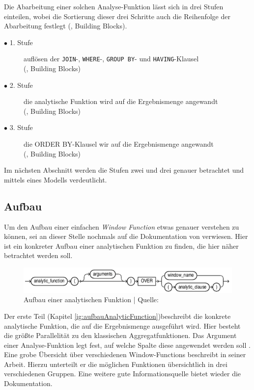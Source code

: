Die Abarbeitung einer solchen Analyse-Funktion lässt sich in drei Stufen einteilen,
wobei die Sortierung dieser drei Schritte auch die Reihenfolge der Abarbeitung
festlegt (\cite{Nuijten2023}, Building Blocks).
\begin{description}
	\item[$\bullet$ 1. Stufe] auflösen der \texttt{JOIN}-, \texttt{WHERE}-, \texttt{GROUP
		BY}- und \texttt{HAVING}-Klausel \\ (\cite{Nuijten2023}, Building Blocks)

	\item[$\bullet$ 2. Stufe] die analytische Funktion wird auf die Ergebnismenge angewandt
		\\ (\cite{Nuijten2023}, Building Blocks)

	\item[$\bullet$ 3. Stufe] die ORDER BY-Klausel wir auf die Ergebnismenge angewandt
		\\ (\cite{Nuijten2023}, Building Blocks)
\end{description}
Im nächsten Abschnitt werden die Stufen zwei und drei genauer betrachtet und
mittels eines Modells verdeutlicht.

\subsection{Aufbau}
\label{sec:aufbau} Um den Aufbau einer einfachen \textit{Window Function} etwas genauer
verstehen zu können, sei an dieser Stelle nochmals auf die Dokumentation von
\citet{oracle} verwiesen. Hier ist ein konkreter Aufbau einer analytischen
Funktion zu finden, die hier näher betrachtet werden soll.
\begin{figure}[h]
	\centering
	\includegraphics[scale=0.5]{img/aufbauAnalyticFunction.jpg}
	\caption{ Aufbau einer analytischen Funktion | Quelle: \citep{oracle}}
	\label{fig:aufbauAnalyticFunction}
\end{figure}
Der erste Teil (Kapitel \ref{ig:aufbauAnalyticFunction})beschreibt die konkrete analytische
Funktion, die auf die Ergebnismenge ausgeführt wird. Hier besteht die größte Parallelität
zu den klassischen Aggregatfunktionen. Das Argument einer Analyse-Funktion legt
fest, auf welche Spalte diese angewendet werden soll \citep[S.~110]{schicker2017datenbanken}.
Eine grobe Übersicht über verschiedenen Window-Functions beschreibt \citet[]{ibrahaim23}
in seiner Arbeit. Hierzu unterteilt er die möglichen Funktionen übersichtlich in
drei verschiedenen Gruppen. Eine weitere gute Informationsquelle bietet wieder
die \citet{oracle} Dokumentation.

